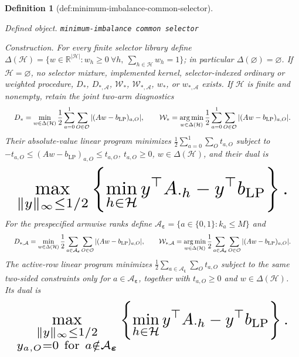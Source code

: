 \documentclass{article}
\newtheorem{definition}{Definition}
\begin{document}
\begin{definition}[def:minimum-imbalance-common-selector]\label{def:minimum-imbalance-common-selector}
\par\smallskip\noindent\emph{Defined object.} \texttt{minimum-\allowbreak{}imbalance common selector}
\par\smallskip\noindent\emph{Construction.} For every finite selector library define \(\Delta(\mathcal H)=\{w\in\mathbb R^{|\mathcal H|}:w_h\ge0\ \forall h,\ \sum_{h\in\mathcal H}w_h=1\}\); in particular \(\Delta(\varnothing)=\varnothing\). If \(\mathcal H=\varnothing\), no selector mixture, implemented kernel, selector-indexed ordinary or weighted procedure, \(D_*\), \(D_{*,\mathcal A}\), \(\mathcal W_*\), \(\mathcal W_{*,\mathcal A}\), \(w_*\), or \(w_{*,\mathcal A}\) exists. If \(\mathcal H\) is finite and nonempty, retain the joint two-arm diagnostics
\[
\makebox[\linewidth][c]{\resizebox{0.98\linewidth}{!}{\(\displaystyle D_*=\min_{w\in\Delta(\mathcal H)}\frac12\sum_{a=0}^1\sum_{O\in\mathcal O}|(Aw-b_{\mathrm{LP}})_{a,O}|,\qquad
\mathcal W_*=\operatorname*{arg\,min}_{w\in\Delta(\mathcal H)}\frac12\sum_{a=0}^1\sum_{O\in\mathcal O}|(Aw-b_{\mathrm{LP}})_{a,O}|.\)}}
\]
Their absolute-value linear program minimizes \(\frac12\sum_{a=0}^1\sum_Ot_{a,O}\) subject to \(-t_{a,O}\le(Aw-b_{\mathrm{LP}})_{a,O}\le t_{a,O}\), \(t_{a,O}\ge0\), \(w\in\Delta(\mathcal H)\), and their dual is
\[
\makebox[\linewidth][c]{\resizebox{0.98\linewidth}{!}{\par\noindent \makebox[\linewidth][c]{\resizebox{0.98\linewidth}{!}{\(\displaystyle \displaystyle \max_{\lVert y\rVert_\infty\le1/2}\left\{\min_{h\in\mathcal H}y^\top A_{\cdot h}-y^\top b_{\mathrm{LP}}\right\}.\)}}\par\noindent}}
\]
For the prespecified armwise ranks define \(\mathcal A_{\boldsymbol\varepsilon}=\{a\in\{0,1\}:k_a\le M\}\) and
\[
\makebox[\linewidth][c]{\resizebox{0.98\linewidth}{!}{\(\displaystyle D_{*,\mathcal A}=\min_{w\in\Delta(\mathcal H)}\frac12\sum_{a\in\mathcal A_{\boldsymbol\varepsilon}}\sum_{O\in\mathcal O}|(Aw-b_{\mathrm{LP}})_{a,O}|,\qquad
\mathcal W_{*,\mathcal A}=\operatorname*{arg\,min}_{w\in\Delta(\mathcal H)}\frac12\sum_{a\in\mathcal A_{\boldsymbol\varepsilon}}\sum_{O\in\mathcal O}|(Aw-b_{\mathrm{LP}})_{a,O}|.\)}}
\]
The active-row linear program minimizes \(\frac12\sum_{a\in\mathcal A_{\boldsymbol\varepsilon}}\sum_Ot_{a,O}\) subject to the same two-sided constraints only for \(a\in\mathcal A_{\boldsymbol\varepsilon}\), together with \(t_{a,O}\ge0\) and \(w\in\Delta(\mathcal H)\). Its dual is
\[
\makebox[\linewidth][c]{\resizebox{0.98\linewidth}{!}{\par\noindent \makebox[\linewidth][c]{\resizebox{0.98\linewidth}{!}{\(\displaystyle \displaystyle \max_{\substack{\lVert y\rVert_\infty\le1/2\\y_{a,O}=0\ \mathrm{for}\ a\notin\mathcal A_{\boldsymbol\varepsilon}}}\left\{\min_{h\in\mathcal H}y^\top A_{\cdot h}-y^\top b_{\mathrm{LP}}\right\}.\)}}\par\noindent}}
\]
\end{definition}
\end{document}
